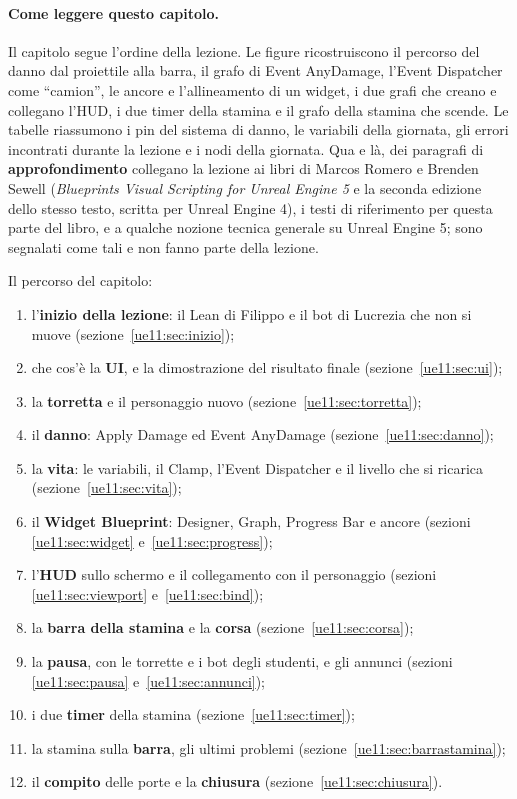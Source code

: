 \paragraph{Come leggere questo capitolo.} Il capitolo segue l'ordine della lezione. Le
figure ricostruiscono il percorso del danno dal proiettile alla barra, il grafo di Event
AnyDamage, l'Event Dispatcher come ``camion'', le ancore e l'allineamento di un widget,
i due grafi che creano e collegano l'HUD, i due timer della stamina e il grafo della
stamina che scende. Le tabelle riassumono i pin del sistema di danno, le variabili della
giornata, gli errori incontrati durante la lezione e i nodi della giornata. Qua e là, dei
paragrafi di \textbf{approfondimento} collegano la lezione ai libri di Marcos Romero e
Brenden Sewell (\emph{Blueprints Visual Scripting for Unreal Engine 5} e la seconda
edizione dello stesso testo, scritta per Unreal Engine 4), i testi di riferimento per
questa parte del libro, e a qualche nozione tecnica generale su Unreal Engine 5; sono
segnalati come tali e non fanno parte della lezione.

Il percorso del capitolo:
\begin{enumerate}
  \item l'\textbf{inizio della lezione}: il Lean di Filippo e il bot di Lucrezia che non
        si muove (sezione~\ref{ue11:sec:inizio});
  \item che cos'è la \textbf{UI}, e la dimostrazione del risultato finale
        (sezione~\ref{ue11:sec:ui});
  \item la \textbf{torretta} e il personaggio nuovo (sezione~\ref{ue11:sec:torretta});
  \item il \textbf{danno}: Apply Damage ed Event AnyDamage (sezione~\ref{ue11:sec:danno});
  \item la \textbf{vita}: le variabili, il Clamp, l'Event Dispatcher e il livello che si
        ricarica (sezione~\ref{ue11:sec:vita});
  \item il \textbf{Widget Blueprint}: Designer, Graph, Progress Bar e ancore (sezioni
        \ref{ue11:sec:widget} e~\ref{ue11:sec:progress});
  \item l'\textbf{HUD} sullo schermo e il collegamento con il personaggio (sezioni
        \ref{ue11:sec:viewport} e~\ref{ue11:sec:bind});
  \item la \textbf{barra della stamina} e la \textbf{corsa} (sezione~\ref{ue11:sec:corsa});
  \item la \textbf{pausa}, con le torrette e i bot degli studenti, e gli annunci (sezioni
        \ref{ue11:sec:pausa} e~\ref{ue11:sec:annunci});
  \item i due \textbf{timer} della stamina (sezione~\ref{ue11:sec:timer});
  \item la stamina sulla \textbf{barra}, gli ultimi problemi (sezione~\ref{ue11:sec:barrastamina});
  \item il \textbf{compito} delle porte e la \textbf{chiusura}
        (sezione~\ref{ue11:sec:chiusura}).
\end{enumerate}


